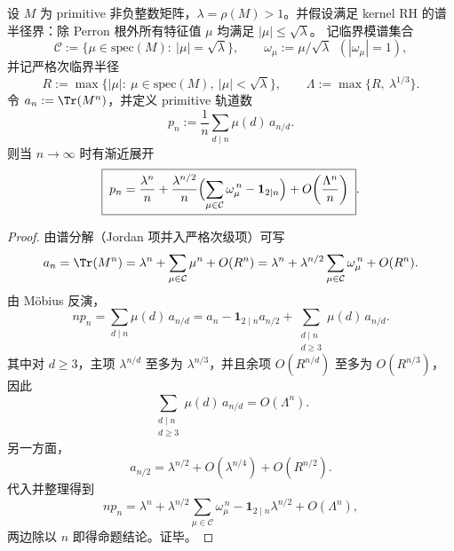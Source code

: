 \begin{proposition}[平方根项的相位共振公式：临界模谱与 \texorpdfstring{$d=2$}{d=2} 项的干涉]\label{prop:finite-rh-sqrt-resonance-general}
设 \(M\) 为 primitive 非负整数矩阵，\(\lambda=\rho(M)>1\)。并假设满足 kernel RH 的谱半径界：除 Perron 根外所有特征值 \(\mu\) 均满足 \(|\mu|\le \sqrt{\lambda}\)。
记临界模谱集合
\[
\mathcal{C}:=\{\mu\in\mathrm{spec}(M):\ |\mu|=\sqrt{\lambda}\},
\qquad
\omega_\mu:=\mu/\sqrt{\lambda}\ \ (|\omega_\mu|=1),
\]
并记严格次临界半径
\[
R:=\max\{|\mu|:\ \mu\in\mathrm{spec}(M),\ |\mu|<\sqrt{\lambda}\},
\qquad
\Lambda:=\max\{R,\ \lambda^{1/3}\}.
\]
令 \(a_n:=\Tr(M^n)\)，并定义 primitive 轨道数
\[
p_n:=\frac{1}{n}\sum_{d\mid n}\mu(d)\,a_{n/d}.
\]
则当 \(n\to\infty\) 时有渐近展开
\[
\boxed{\;
p_n
=\frac{\lambda^n}{n}
+\frac{\lambda^{n/2}}{n}\Bigl(\sum_{\mu\in\mathcal{C}}\omega_\mu^{\,n}-\mathbf{1}_{2\mid n}\Bigr)
+O\!\left(\frac{\Lambda^n}{n}\right)\; }.
\]
\end{proposition}
\begin{proof}
由谱分解（Jordan 项并入严格次级项）可写
\[
a_n=\Tr(M^n)=\lambda^n+\sum_{\mu\in\mathcal{C}}\mu^n+O(R^n)
=\lambda^n+\lambda^{n/2}\sum_{\mu\in\mathcal{C}}\omega_\mu^{\,n}+O(R^n).
\]
由 Möbius 反演，
\[
np_n=\sum_{d\mid n}\mu(d)\,a_{n/d}
=a_n-\mathbf{1}_{2\mid n}a_{n/2}+\sum_{\substack{d\mid n\\ d\ge 3}}\mu(d)\,a_{n/d}.
\]
其中对 \(d\ge 3\)，主项 \(\lambda^{n/d}\) 至多为 \(\lambda^{n/3}\)，并且余项 \(O(R^{n/d})\) 至多为 \(O(R^{n/3})\)，因此
\[
\sum_{\substack{d\mid n\\ d\ge 3}}\mu(d)\,a_{n/d}=O(\Lambda^n).
\]
另一方面，
\[
a_{n/2}=\lambda^{n/2}+O(\lambda^{n/4})+O(R^{n/2}).
\]
代入并整理得到
\[
np_n=\lambda^n+\lambda^{n/2}\sum_{\mu\in\mathcal{C}}\omega_\mu^{\,n}-\mathbf{1}_{2\mid n}\lambda^{n/2}+O(\Lambda^n),
\]
两边除以 \(n\) 即得命题结论。证毕。
\end{proof}
